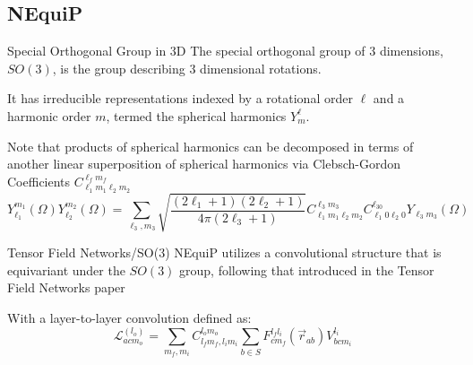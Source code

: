 \documentclass[handout, 11pt]{beamer}
\begin{document}


\subsection{NEquiP}
\begin{frame}{Special Orthogonal Group in 3D}
The special orthogonal group of 3 dimensions, $SO(3)$, is
the group describing 3 dimensional rotations.

It has irreducible representations indexed by a rotational order $\ell$ and a harmonic order $m$, termed the spherical harmonics $Y^{\ell}_m$.

Note that products of spherical harmonics can be decomposed in terms of another linear superposition of spherical harmonics via Clebsch-Gordon Coefficients $C^{\ell_f  m_f}_{\ell_1  m_1\ell_2 m_2}$
$$
Y_{\ell_1}^{m_1}(\Omega)Y_{\ell_2}^{m_2}(\Omega)=\sum_{\ell_3, m_3}\sqrt{\frac{(2\ell_1+1)(2\ell_2+1)}{4\pi(2\ell_3+1)}}C^{\ell_3m_3}_{\ell_1m_1\ell_2m_2}C^{\ell_30}_{\ell_1 0\ell_2 0}Y_{\ell_3m_3}(\Omega)
$$
\end{frame}

\begin{frame}{Tensor Field Networks/SO(3)}
NEquiP utilizes a convolutional structure that is equivariant under the $SO(3)$ group, following that introduced in the Tensor Field Networks paper

\medskip

With a layer-to-layer convolution defined as:
$$
\mathcal{L}_{acm_o}^{(l_o)} = \sum_{m_f,m_i} C_{l_fm_f,l_im_i}^{l_om_o}\sum_{b\in S}F_{cm_f}^{l_fl_i}(\vec{r}_{ab})V_{bcm_i}^{l_i}
$$
\end{frame}



\end{document}
